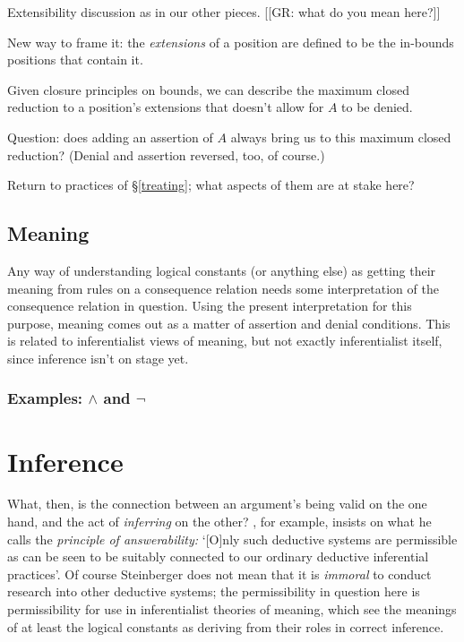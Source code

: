\documentclass{article}
\begin{document}
Extensibility discussion as in our other pieces. [[GR: what do you mean here?]]

New way to frame it: the {\em extensions} of a position are defined to be the in-bounds positions that contain it. 

Given closure principles on bounds, we can describe the maximum closed reduction to a position's extensions that doesn't allow for $A$ to be denied.

Question: does adding an assertion of $A$ always bring us to this maximum closed reduction?
(Denial and assertion reversed, too, of course.)

Return to practices of \S\ref{treating}; what aspects of them are at stake here?

\subsection{Meaning} \label{meaning}

Any way of understanding logical constants (or anything else) as getting their meaning from rules on a consequence relation needs some interpretation of the consequence relation in question.
Using the present interpretation for this purpose, meaning comes out as a matter of assertion and denial conditions.
This is related to inferentialist views of meaning, but not exactly inferentialist itself, since inference isn't on stage yet.

\subsubsection{Examples: $\wedge$ and $\neg$} \label{operational}




\section{Inference}

What, then, is the connection between an argument's being valid on the one hand, and the act of {\em inferring} on the other?
\cite{steinberger:wcsrs}, for example, insists on what he calls the {\em principle of answerability:} `[O]nly such deductive systems are permissible as can be seen to be suitably connected to our ordinary deductive inferential practices'.
Of course Steinberger does not mean that it is {\em immoral} to conduct research into other deductive systems; the permissibility in question here is permissibility for use in inferentialist theories of meaning, which see the meanings of at least the logical constants as deriving from their roles in correct inference.
\end{document}
